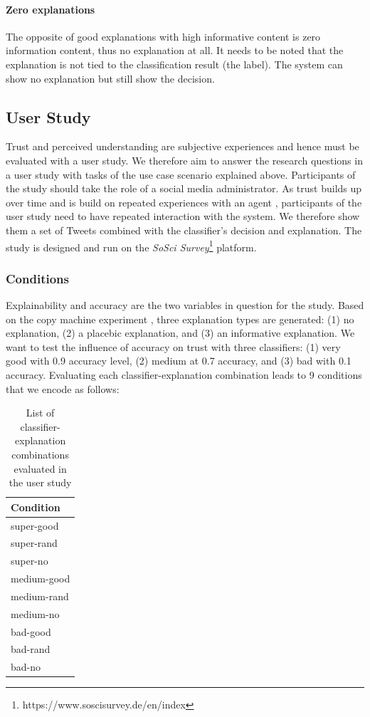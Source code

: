 \paragraph{Zero explanations}
The opposite of good explanations with high informative content is zero information content, thus no explanation at all. It needs to be noted that the explanation is not tied to the classification result (the label). The system can show no explanation but still show the decision. 



\subsection{User Study}
Trust and perceived understanding are subjective experiences and hence must be evaluated with a user study. We therefore aim to answer the research questions in a user study with tasks of the use case scenario explained above. Participants of the study should take the role of a social media administrator. As trust builds up over time and is build on repeated experiences with an agent \cite{rempel1985trust}, participants of the user study need to have repeated interaction with the system. We therefore show them a set of Tweets combined with the classifier's decision and explanation. The study is designed and run on the \textit{SoSci Survey}\footnote{https://www.soscisurvey.de/en/index} platform.\newline

\subsubsection{Conditions}
Explainability and accuracy are the two variables in question for the study. Based on the copy machine experiment \cite{langer1978mindlessness}, three explanation types are generated: (1) no explanation, (2) a placebic explanation, and (3) an informative explanation. We want to test the influence of accuracy on trust with three classifiers: (1) very good with 0.9 accuracy level, (2) medium at 0.7 accuracy, and (3) bad with 0.1 accuracy. Evaluating each classifier-explanation combination leads to 9 conditions that we encode as follows:
\begin{table}[H]
	\centering
	\begin{tabular}{l}
		\textbf{Condition}\\ \midrule
		super-good\\
		super-rand\\
		super-no\\
		medium-good\\
		medium-rand\\
		medium-no\\
		bad-good\\
		bad-rand\\
		bad-no\\ \bottomrule
	\end{tabular}
	\caption{List of classifier-explanation combinations evaluated in the user study}
	\label{tab:conditions}
\end{table} 


